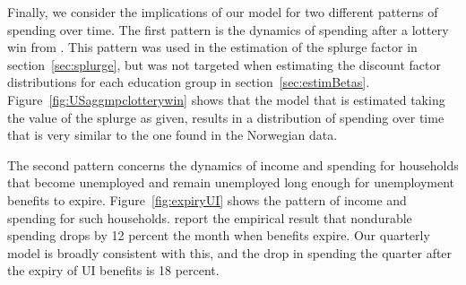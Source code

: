 \documentclass[\econtexRoot/HAFiscal]{subfiles}
\begin{document}
Finally, we consider the implications of our model for two different patterns of spending over time. The first pattern is the dynamics of spending after a lottery win from \citeauthor{fagereng_mpc_2021}. This pattern was used in the estimation of the splurge factor in section~\ref{sec:splurge}, but was not targeted when estimating the discount factor distributions for each education group in section~\ref{sec:estimBetas}. Figure~\ref{fig:USaggmpclotterywin} shows that the model that is estimated taking the value of the splurge as given, results in a distribution of spending over time that is very similar to the one found in the Norwegian data. 

The second pattern concerns the dynamics of income and spending for households that become unemployed and remain unemployed long enough for unemployment benefits to expire. Figure~\ref{fig:expiryUI} shows the pattern of income and spending for such households.  \citet{ganongConsumer2019} report the empirical result that nondurable spending drops by 12 percent the month when benefits expire. Our quarterly model is broadly consistent with this, and the drop in spending the quarter after the expiry of UI benefits is 18 percent. 

\end{document}
